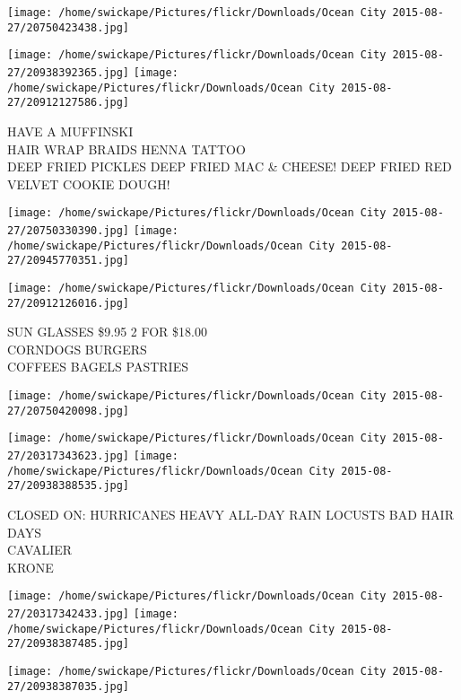 \documentclass[10pt,letterpaper]{article}
\begin{document}
\texttt{[image: /home/swickape/Pictures/flickr/Downloads/Ocean City 2015-08-27/20750423438.jpg]}

\vspace{0.25in}
\texttt{[image: /home/swickape/Pictures/flickr/Downloads/Ocean City 2015-08-27/20938392365.jpg]}
\texttt{[image: /home/swickape/Pictures/flickr/Downloads/Ocean City 2015-08-27/20912127586.jpg]}

HAVE A MUFFINSKI\\
HAIR WRAP BRAIDS HENNA TATTOO\\
DEEP FRIED PICKLES  DEEP FRIED MAC \& CHEESE!  DEEP FRIED RED VELVET COOKIE DOUGH!\\
\pagebreak

\texttt{[image: /home/swickape/Pictures/flickr/Downloads/Ocean City 2015-08-27/20750330390.jpg]}
\texttt{[image: /home/swickape/Pictures/flickr/Downloads/Ocean City 2015-08-27/20945770351.jpg]}

\texttt{[image: /home/swickape/Pictures/flickr/Downloads/Ocean City 2015-08-27/20912126016.jpg]}

SUN GLASSES \$9.95 2 FOR \$18.00\\
CORNDOGS BURGERS\\
COFFEES BAGELS PASTRIES\\
\pagebreak

\texttt{[image: /home/swickape/Pictures/flickr/Downloads/Ocean City 2015-08-27/20750420098.jpg]}

\vspace{0.25in}
\texttt{[image: /home/swickape/Pictures/flickr/Downloads/Ocean City 2015-08-27/20317343623.jpg]}
\texttt{[image: /home/swickape/Pictures/flickr/Downloads/Ocean City 2015-08-27/20938388535.jpg]}

CLOSED ON: HURRICANES HEAVY ALL{-}DAY RAIN LOCUSTS BAD HAIR DAYS\\
CAVALIER\\
KRONE\\
\pagebreak

\texttt{[image: /home/swickape/Pictures/flickr/Downloads/Ocean City 2015-08-27/20317342433.jpg]}
\texttt{[image: /home/swickape/Pictures/flickr/Downloads/Ocean City 2015-08-27/20938387485.jpg]}

\texttt{[image: /home/swickape/Pictures/flickr/Downloads/Ocean City 2015-08-27/20938387035.jpg]}
\end{document}

